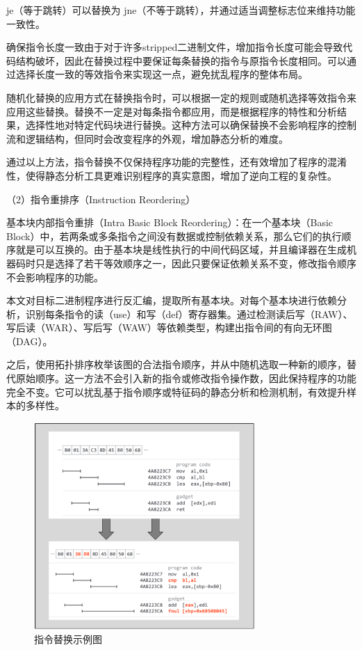 je（等于跳转）可以替换为 jne（不等于跳转），并通过适当调整标志位来维持功能一致性。

确保指令长度一致由于对于许多stripped二进制文件，增加指令长度可能会导致代码结构破坏，因此在替换过程中要保证每条替换的指令与原指令长度相同。可以通过选择长度一致的等效指令来实现这一点，避免扰乱程序的整体布局。

随机化替换的应用方式在替换指令时，可以根据一定的规则或随机选择等效指令来应用这些替换。替换不一定是对每条指令都应用，而是根据程序的特性和分析结果，选择性地对特定代码块进行替换。这种方法可以确保替换不会影响程序的控制流和逻辑结构，但同时会改变程序的外观，增加静态分析的难度。

通过以上方法，指令替换不仅保持程序功能的完整性，还有效增加了程序的混淆性，使得静态分析工具更难识别程序的真实意图，增加了逆向工程的复杂性。

（2）指令重排序（Instruction Reordering）

基本块内部指令重排（Intra Basic Block Reordering）：在一个基本块（Basic Block）中，若两条或多条指令之间没有数据或控制依赖关系，那么它们的执行顺序就是可以互换的。由于基本块是线性执行的中间代码区域，并且编译器在生成机器码时只是选择了若干等效顺序之一，因此只要保证依赖关系不变，修改指令顺序不会影响程序的功能。

本文对目标二进制程序进行反汇编，提取所有基本块。对每个基本块进行依赖分析，识别每条指令的读（use）和写（def）寄存器集。通过检测读后写（RAW）、写后读（WAR）、写后写（WAW）等依赖类型，构建出指令间的有向无环图（DAG）。

之后，使用拓扑排序枚举该图的合法指令顺序，并从中随机选取一种新的顺序，替代原始顺序。这一方法不会引入新的指令或修改指令操作数，因此保持程序的功能完全不变。它可以扰乱基于指令顺序或特征码的静态分析和检测机制，有效提升样本的多样性。

\begin{figure}[hbt]
	\centering
	\includegraphics[width=0.75\textwidth]{figures/4.2}
	\caption{指令替换示例图}\label{fig:4.2}
\end{figure}

